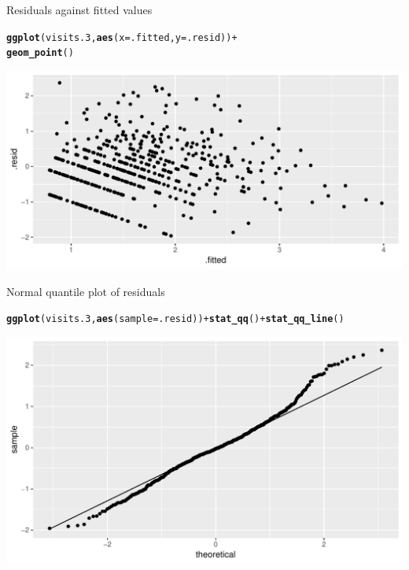 \documentclass[unknownkeysallowed]{beamer}\usepackage[]{graphicx}\usepackage[]{color}
\makeatletter
\def\maxwidth{ %
  \ifdim\Gin@nat@width>\linewidth
    \linewidth
  \else
    \Gin@nat@width
  \fi
}
\newcommand{\hlopt}[1]{\textcolor[rgb]{0,0,0}{#1}}%
\newcommand{\hlstd}[1]{\textcolor[rgb]{0.345,0.345,0.345}{#1}}%
\newcommand{\hlkwc}[1]{\textcolor[rgb]{0.333,0.667,0.333}{#1}}%
\newcommand{\hlkwd}[1]{\textcolor[rgb]{0.737,0.353,0.396}{\textbf{#1}}}%
\newenvironment{kframe}{%
 \def\at@end@of@kframe{}%
 \ifinner\ifhmode%
  \def\at@end@of@kframe{\end{minipage}}%
  \begin{minipage}{\columnwidth}%
 \fi\fi%
 \def\FrameCommand##1{\hskip\@totalleftmargin \hskip-\fboxsep
 \colorbox{shadecolor}{##1}\hskip-\fboxsep
     \hskip-\linewidth \hskip-\@totalleftmargin \hskip\columnwidth}%
 \MakeFramed {\advance\hsize-\width
   \@totalleftmargin\z@ \linewidth\hsize
   \@setminipage}}%
 {\par\unskip\endMakeFramed%
 \at@end@of@kframe}
\newenvironment{knitrout}{}{} %
\makeatother
\begin{document}
\begin{frame}[fragile]{Residuals against fitted values}
  
\begin{knitrout}
\color{fgcolor}\begin{kframe}
\begin{alltt}
\hlkwd{ggplot}\hlstd{(visits.3,}\hlkwd{aes}\hlstd{(}\hlkwc{x}\hlstd{=.fitted,}\hlkwc{y}\hlstd{=.resid))}\hlopt{+}
  \hlkwd{geom_point}\hlstd{()}
\end{alltt}
\end{kframe}
\includegraphics[width=\maxwidth]{figure/unnamed-chunk-34-1} 

\end{knitrout}
\end{frame}

\begin{frame}[fragile]{Normal quantile plot of residuals}
  
\begin{knitrout}
\color{fgcolor}\begin{kframe}
\begin{alltt}
\hlkwd{ggplot}\hlstd{(visits.3,} \hlkwd{aes}\hlstd{(}\hlkwc{sample}\hlstd{=.resid))}\hlopt{+}\hlkwd{stat_qq}\hlstd{()}\hlopt{+}\hlkwd{stat_qq_line}\hlstd{()}
\end{alltt}
\end{kframe}
\includegraphics[width=\maxwidth]{figure/unnamed-chunk-35-1} 

\end{knitrout}
  
\end{frame}
\end{document}
